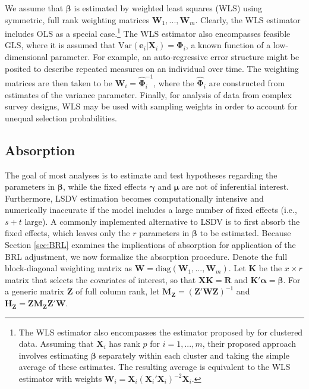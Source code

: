 \documentclass[12pt]{article}\usepackage[]{graphicx}\usepackage[]{color}
\newcommand{\Var}{\text{Var}}
\newcommand{\bm}{\mathbf}
\newcommand{\bs}{\boldsymbol}
\begin{document}
We assume that $\bs\beta$ is estimated by weighted least squares (WLS) using symmetric, full rank weighting matrices $\bm{W}_1,...,\bm{W}_m$. 
Clearly, the WLS estimator includes OLS as a special case.\footnote{
The WLS estimator also encompasses the estimator proposed by \citet{Ibragimov2010tstatistic} for clustered data. 
Assuming that $\bm{X}_i$ has rank $p$ for $i = 1,...,m$, their proposed approach involves estimating $\bs\beta$ separately within each cluster and taking the simple average of these estimates. 
The resulting average is equivalent to the WLS estimator with weights $\bm{W}_i = \bm{X}_i \left(\bm{X}_i'\bm{X}_i\right)^{-2} \bm{X}_i$.} 
The WLS estimator also encompasses feasible GLS, where it is assumed that $\Var\left(\bm{e}_i\left|\bm{X}_i\right.\right) = \bs\Phi_i$, a known function of a low-dimensional parameter. 
For example, an auto-regressive error structure might be posited to describe repeated measures on an individual over time. 
The weighting matrices are then taken to be $\bm{W}_i = \hat{\bs\Phi}_i^{-1}$, where the $\hat{\bs\Phi}_i$ are constructed from estimates of the variance parameter.
Finally, for analysis of data from complex survey designs, WLS may be used with sampling weights in order to account for unequal selection probabilities.

\subsection{Absorption}

The goal of most analyses is to estimate and test hypotheses regarding the parameters in $\bs\beta$, while the fixed effects $\bs\gamma$ and $\bs\mu$ are not of inferential interest. Furthermore, LSDV estimation becomes computationally intensive and numerically inaccurate if the model includes a large number of fixed effects (i.e., $s + t$ large). 
A commonly implemented alternative to LSDV is to first absorb the fixed effects, which leaves only the $r$ parameters in $\bs\beta$ to be estimated. 
Because Section \ref{sec:BRL} examines the implications of absorption for application of the BRL adjustment, we now formalize the absorption procedure.
Denote the full block-diagonal weighting matrix as $\bm{W} = \text{diag}\left(\bm{W}_1,...,\bm{W}_m\right)$.
Let $\bm{K}$ be the $x \times r$ matrix that selects the covariates of interest, so that $\bm{X} \bm{K} = \bm{R}$ and $\bm{K}'\bs\alpha = \bs\beta$.
For a generic matrix $\bm{Z}$ of full column rank, let $\bm{M_Z} = \left(\bm{Z}'\bm{W}\bm{Z}\right)^{-1}$ and $\bm{H_Z} = \bm{Z}\bm{M_Z}\bm{Z}'\bm{W}$. 
\end{document}
